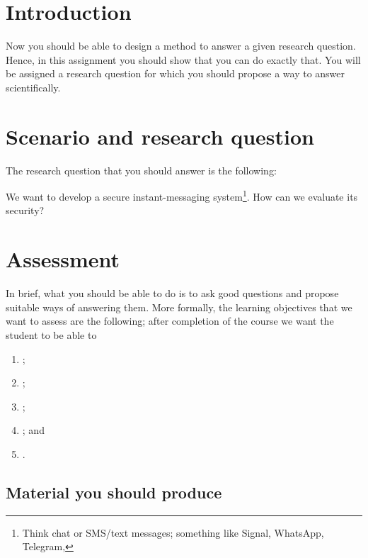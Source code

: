 \mode*

\section{Introduction}

Now you should be able to design a method to answer a given research question.
Hence, in this assignment you should show that you can do exactly that.
You will be assigned a research question for which you should propose a way to 
answer scientifically.

%
%
%

\section{Scenario and research question}

The research question that you should answer is the following:
\begin{question}
  We want to develop a secure instant-messaging system\footnote{%
    Think chat or SMS/text messages; something like Signal, WhatsApp, Telegram, 
    \etc
  }.
  How can we evaluate its security?
\end{question}

\section{Assessment}\label{Assessment}

In brief, what you should be able to do is to ask good questions and propose 
suitable ways of answering them.
More formally, the learning objectives that we want to assess are the 
following; after completion of the course we want the student to be able to
\begin{enumerate}[label={(LO\arabic*)},ref=LO\arabic*]
  \item \LOrelate*;
  \item \LOevaluate*;
  \item \LOapply*;
  \item \LOplan*; and
  \item \LOcomm*.
\end{enumerate}

\subsection{Material you should produce}

